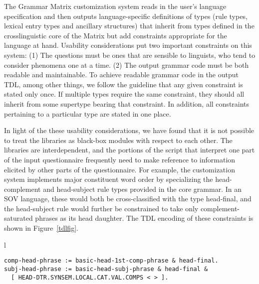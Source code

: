 \documentclass[11pt]{article}
\begin{document}
The Grammar Matrix customization system reads in the user's language
specification and then outputs language-specific definitions of types
(rule types, lexical entry types and ancillary structures) that
inherit from types defined in the crosslinguistic core of the Matrix
but add constraints appropriate for the language at hand. 
Usability considerations put two important constraints on this system:
(1) The questions must be ones that are sensible to linguists,
who tend to consider phenomena one at a time.  
(2) The output grammar code must be both readable and maintainable.
To achieve readable grammar code in the output TDL, among other
things, we follow the guideline that any given constraint is
stated only once.  If multiple types require the same constraint, they
should all inherit from some supertype bearing that constraint.
In addition, all constraints pertaining to a particular type are
stated in one place.

In light of the these usability considerations, we
have found that it is not possible to treat the libraries as black-box
modules with respect to each other.  The libraries are interdependent,
and the portions of the script that interpret one part of the input
questionnaire frequently need to make reference to information
elicited by other parts of the questionnaire.  For example, the
customization system implements major constituent word order by
specializing the head-complement and head-subject rule types provided
in the core grammar.  In an SOV language, these would both be
cross-classified with the type head-final, and the head-subject rule
would further be constrained to take only complement-saturated phrases
as its head daughter.  The TDL encoding of these constraints is shown
in Figure~\ref{tdlfig}.

\begin{figure*}[ht]
\small
\begin{center}
\begin{tabular}{l}
\begin{minipage}{5in}
\begin{verbatim}
comp-head-phrase := basic-head-1st-comp-phrase & head-final.
subj-head-phrase := basic-head-subj-phrase & head-final &
  [ HEAD-DTR.SYNSEM.LOCAL.CAT.VAL.COMPS < > ].
\end{verbatim}
\end{minipage}\\
\end{tabular}
\end{center}
\caption{Specialized phrase structure rule types for SOV language}
\label{tdlfig}
\end{figure*}
\end{document}
